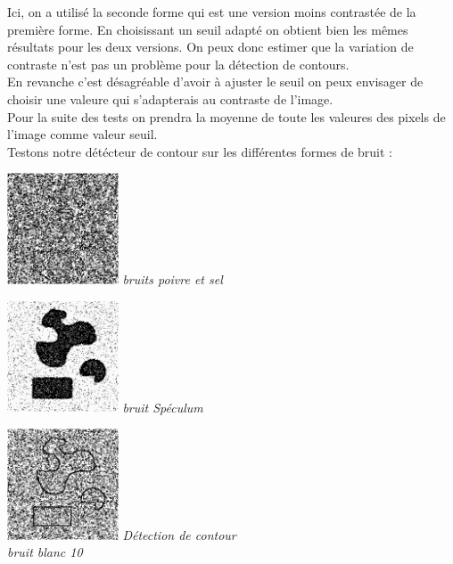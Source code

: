 \documentclass[a4,12pt]{article}
\begin{document}
Ici, on a utilisé la seconde forme qui est une version moins contrastée de la première forme. En choisissant un seuil adapté on obtient bien les mêmes résultats pour les deux versions.
On peux donc estimer que la variation de contraste n'est pas un problème pour la détection de contours.\\
En revanche c'est désagréable d'avoir à ajuster le seuil on peux envisager de choisir une valeure qui s'adapterais au contraste de l'image.\\
Pour la suite des tests on prendra la moyenne de toute les valeures des pixels de l'image comme valeur seuil.\\
Testons notre détécteur de contour sur les différentes formes de bruit :\\

\noindent
\begin{center}
\begin{minipage}[c]{0.20\linewidth}
	\begin{center}
		\includegraphics[width = 33mm]{./img/p2test_grad_mean_formes2pets5.jpg}
		\textit{bruits poivre et sel}
	\end{center}
\end{minipage}
\begin{minipage}[c]{0.20\linewidth}
	\begin{center}
		\includegraphics[width = 33mm]{./img/p2test_grad_mean_formes1sp.jpg}
		\textit{bruit Spéculum}
	\end{center}
\end{minipage}
\begin{minipage}[c]{0.20\linewidth}
	\begin{center}
		\includegraphics[width = 33mm]{./img/p2test_grad_mean_formes2bb10.jpg}
		\textit{Détection de contour \\bruit blanc 10}
	\end{center}
\end{minipage}
\end{center}
\end{document}
